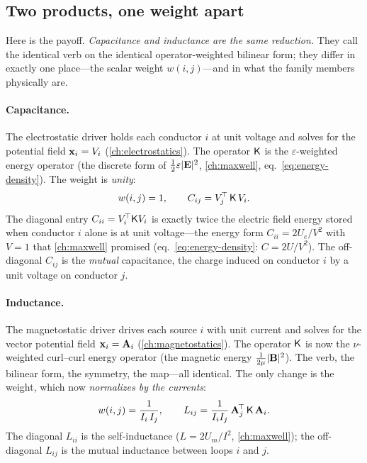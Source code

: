 \subsection{Two products, one weight apart}

Here is the payoff. \emph{Capacitance and inductance are the same reduction.}
They call the identical verb  on the identical operator-weighted
bilinear form; they differ in exactly one place---the scalar weight $w(i,j)$---and
in what the family members physically are.

\paragraph{Capacitance.} The electrostatic driver holds each conductor $i$ at
unit voltage and solves for the potential field $\mathbf{x}_i=V_i$
(\cref{ch:electrostatics}). The operator $\mathsf{K}$ is the
$\varepsilon$-weighted energy operator (the discrete form of
$\tfrac12\varepsilon\lvert\mathbf{E}\rvert^2$, \cref{ch:maxwell}, eq.~\eqref{eq:energy-density}).
The weight is \emph{unity}:
\begin{equation}
  w(i,j) = 1,
  \qquad
  C_{ij} = V_j^{\!\top}\,\mathsf{K}\,V_i .
  \label{eq:cap-gram}
\end{equation}
The diagonal entry $C_{ii}=V_i^{\!\top}\mathsf{K} V_i$ is exactly twice the electric
field energy stored when conductor $i$ alone is at unit voltage---the energy form
$C_{ii}=2U_e/V^2$ with $V=1$ that \cref{ch:maxwell} promised
(eq.~\eqref{eq:energy-density}: $C=2U/V^2$). The off-diagonal $C_{ij}$ is the
\emph{mutual} capacitance, the charge induced on conductor $i$ by a unit voltage
on conductor $j$.

\paragraph{Inductance.} The magnetostatic driver drives each source $i$ with
unit current and solves for the vector potential field $\mathbf{x}_i=\mathbf{A}_i$
(\cref{ch:magnetostatics}). The operator $\mathsf{K}$ is now the $\nu$-weighted
curl--curl energy operator (the magnetic energy $\tfrac{1}{2\mu}\lvert\mathbf{B}\rvert^2$).
The verb, the bilinear form, the symmetry, the map---all identical. The only
change is the weight, which now \emph{normalizes by the currents}:
\begin{equation}
  w(i,j) = \frac{1}{I_i\,I_j},
  \qquad
  L_{ij} = \frac{1}{I_i I_j}\,\mathbf{A}_j^{\!\top}\,\mathsf{K}\,\mathbf{A}_i .
  \label{eq:ind-gram}
\end{equation}
The diagonal $L_{ii}$ is the self-inductance ($L=2U_m/I^2$, \cref{ch:maxwell});
the off-diagonal $L_{ij}$ is the mutual inductance between loops $i$ and $j$.

